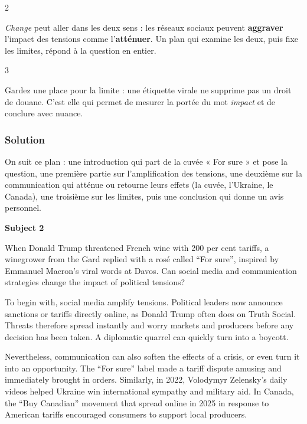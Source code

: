 \documentclass[11pt,a4paper]{article}
\begin{document}
\begin{indication}{2}

\emph{Change} peut aller dans les deux sens : les réseaux sociaux peuvent \textbf{aggraver} l'impact des tensions comme l'\textbf{atténuer}. Un plan qui examine les deux, puis fixe les limites, répond à la question en entier.

\end{indication}

\begin{indication}{3}

Gardez une place pour la limite : une étiquette virale ne supprime pas un droit de douane. C'est elle qui permet de mesurer la portée du mot \emph{impact} et de conclure avec nuance.

\end{indication}

\hypertarget{solution-2}{%
\subsubsection{Solution}\label{solution-2}}

On suit ce plan : une introduction qui part de la cuvée « For sure » et pose la question, une première partie sur l'amplification des tensions, une deuxième sur la communication qui atténue ou retourne leurs effets (la cuvée, l'Ukraine, le Canada), une troisième sur les limites, puis une conclusion qui donne un avis personnel.

\textbf{Subject 2}

When Donald Trump threatened French wine with 200 per cent tariffs, a winegrower from the Gard replied with a rosé called ``For sure'', inspired by Emmanuel Macron's viral words at Davos. Can social media and communication strategies change the impact of political tensions?

To begin with, social media amplify tensions. Political leaders now announce sanctions or tariffs directly online, as Donald Trump often does on Truth Social. Threats therefore spread instantly and worry markets and producers before any decision has been taken. A diplomatic quarrel can quickly turn into a boycott.

Nevertheless, communication can also soften the effects of a crisis, or even turn it into an opportunity. The ``For sure'' label made a tariff dispute amusing and immediately brought in orders. Similarly, in 2022, Volodymyr Zelensky's daily videos helped Ukraine win international sympathy and military aid. In Canada, the ``Buy Canadian'' movement that spread online in 2025 in response to American tariffs encouraged consumers to support local producers.
\end{document}
